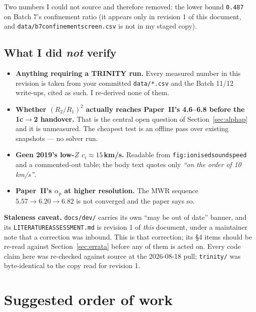 \documentclass[11pt,a4paper,oneside]{report}
\newcommand{\brkus}{\textunderscore\allowbreak}
\newcommand{\code}[1]{\texttt{\small\let\_\brkus #1}}
\newcommand{\lbl}[1]{\texttt{\footnotesize\let\_\brkus #1}}
\newcommand{\PII}{Paper~II}
\newcommand{\ap}{\alpha_p}
\newcommand{\ci}{c_i}
\begin{document}
Two numbers I could not source and therefore removed: the lower bound \code{0.487} on Batch 7's
confinement ratio (it appears only in revision 1 of this document, and
\code{data/b7\_confinement\_screen.csv} is not in my staged copy).

\subsection{What I did \emph{not} verify}

\begin{itemize}
\item \textbf{Anything requiring a TRINITY run.} Every measured number in this revision is
      taken from your committed \code{data/*.csv} and the Batch 11/12 write-ups, cited as
      such. I re-derived none of them.
\item \textbf{Whether $(R_2/R_1)^2$ actually reaches \PII's 4.6--6.8 before the
      1c$\to$2 handover.} That is the central open question of Section~\ref{sec:alphap} and
      it is unmeasured. The cheapest test is an offline pass over existing snapshots --- no
      solver run.
\item \textbf{Geen 2019's low-$Z$ $\ci\approx15\,$km/s.} Readable from
      \lbl{fig:ionisedsoundspeed} and a commented-out table; the body text quotes only
      \emph{``on the order of 10 km/s''}.
\item \textbf{\PII's $\ap$ at higher resolution.} The MWR sequence
      $5.57 \to 6.20 \to 6.82$ is not converged and the paper says so.
\end{itemize}

\textbf{Staleness caveat.} \code{docs/dev/} carries its own ``may be out of date'' banner, and
its \code{LITERATURE\_ASSESSMENT.md} is revision 1 of \emph{this} document, under a maintainer
note that a correction was inbound. This is that correction; its \S4 items should be re-read
against Section~\ref{sec:errata} before any of them is acted on. Every code claim here was
re-checked against source at the 2026-08-18 pull; \code{trinity/} was byte-identical to the
copy read for revision 1.

\section{Suggested order of work}
\end{document}
